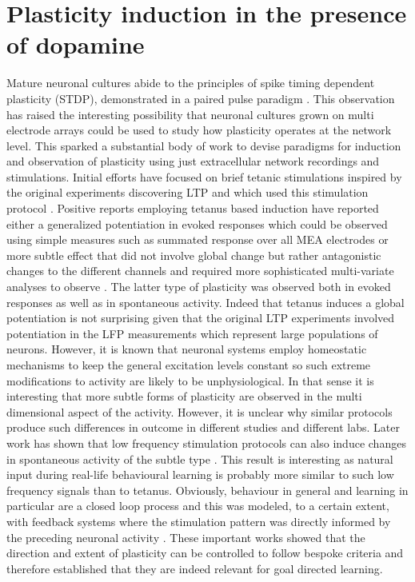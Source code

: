     \section{Plasticity induction in the presence of dopamine}
    Mature neuronal cultures abide to the principles of spike timing dependent plasticity (STDP), demonstrated in a paired pulse paradigm \cite{bi1998synaptic}. This observation has raised the interesting possibility that neuronal cultures grown on multi electrode arrays could be used to study how plasticity operates at the network level. This sparked a substantial body of work to devise paradigms for induction and observation of plasticity using just extracellular network recordings and stimulations. Initial efforts have focused on brief tetanic stimulations inspired by the original experiments discovering LTP and which used this stimulation protocol \cite{bliss1973long}. Positive reports employing tetanus based induction have reported either a generalized potentiation in evoked responses which could be observed using simple measures such as summated response over all MEA electrodes \cite{chiappalone2008network,hamilton2015time,ruaro2005toward} or more subtle effect that did not involve global change but rather antagonistic changes to the different channels and required more sophisticated multi-variate analyses to observe \cite{jimbo1999simultaneous,le2015repeated,madhavan2007plasticity}. The latter type of plasticity was observed both in evoked responses as well as in spontaneous activity. Indeed that tetanus induces a global potentiation is not surprising given that the original LTP experiments involved potentiation in the LFP measurements which represent large populations of neurons. However, it is known that neuronal systems employ homeostatic mechanisms to keep the general excitation levels constant \cite{turrigiano1999homeostatic} so such extreme modifications to activity are likely to be unphysiological. In that sense it is interesting that more subtle forms of plasticity are observed in the multi dimensional aspect of the activity. However, it is unclear why similar protocols produce such differences in outcome in different studies and different labs. Later work has shown that low frequency stimulation protocols can also induce changes in spontaneous activity of the subtle type \cite{le2015repeated,vajda2008low}. This result is interesting as natural input during real-life behavioural learning is probably more similar to such low frequency signals than to tetanus. Obviously, behaviour in general and learning in particular are a closed loop process and this was modeled, to a certain extent, with feedback systems where the stimulation pattern was directly informed by the preceding neuronal activity \cite{bakkum2008spatio,shahaf2001learning}. These important works showed that the direction and extent of plasticity can be controlled to follow bespoke criteria and therefore established that they are indeed relevant for goal directed learning.

